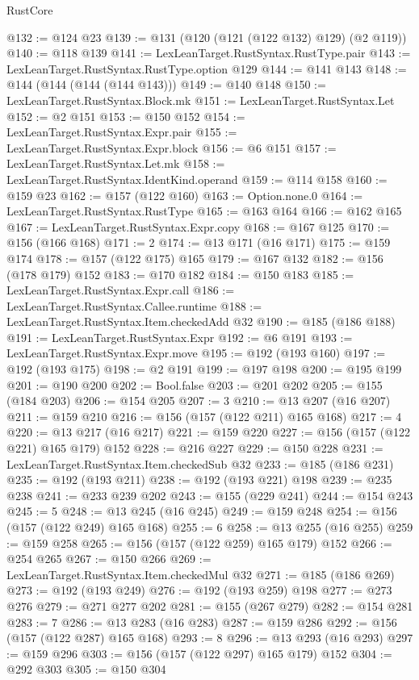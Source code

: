 \begin{lexlean}{RustCore}
\begin{coremodule}
@132 := @124 @23
@139 := @131 (@120 (@121 (@122 @132) @129) (@2 @119))
@140 := @118 @139
@141 := LexLeanTarget.RustSyntax.RustType.pair
@143 := LexLeanTarget.RustSyntax.RustType.option @129
@144 := @141 @143
@148 := @144 (@144 (@144 (@144 @143)))
@149 := @140 @148
@150 := LexLeanTarget.RustSyntax.Block.mk
@151 := LexLeanTarget.RustSyntax.Let
@152 := @2 @151
@153 := @150 @152
@154 := LexLeanTarget.RustSyntax.Expr.pair
@155 := LexLeanTarget.RustSyntax.Expr.block
@156 := @6 @151
@157 := LexLeanTarget.RustSyntax.Let.mk
@158 := LexLeanTarget.RustSyntax.IdentKind.operand
@159 := @114 @158
@160 := @159 @23
@162 := @157 (@122 @160)
@163 := Option.none.{0}
@164 := LexLeanTarget.RustSyntax.RustType
@165 := @163 @164
@166 := @162 @165
@167 := LexLeanTarget.RustSyntax.Expr.copy
@168 := @167 @125
@170 := @156 (@166 @168)
@171 := 2
@174 := @13 @171 (@16 @171)
@175 := @159 @174
@178 := @157 (@122 @175) @165
@179 := @167 @132
@182 := @156 (@178 @179) @152
@183 := @170 @182
@184 := @150 @183
@185 := LexLeanTarget.RustSyntax.Expr.call
@186 := LexLeanTarget.RustSyntax.Callee.runtime
@188 := LexLeanTarget.RustSyntax.Item.checkedAdd @32
@190 := @185 (@186 @188)
@191 := LexLeanTarget.RustSyntax.Expr
@192 := @6 @191
@193 := LexLeanTarget.RustSyntax.Expr.move
@195 := @192 (@193 @160)
@197 := @192 (@193 @175)
@198 := @2 @191
@199 := @197 @198
@200 := @195 @199
@201 := @190 @200
@202 := Bool.false
@203 := @201 @202
@205 := @155 (@184 @203)
@206 := @154 @205
@207 := 3
@210 := @13 @207 (@16 @207)
@211 := @159 @210
@216 := @156 (@157 (@122 @211) @165 @168)
@217 := 4
@220 := @13 @217 (@16 @217)
@221 := @159 @220
@227 := @156 (@157 (@122 @221) @165 @179) @152
@228 := @216 @227
@229 := @150 @228
@231 := LexLeanTarget.RustSyntax.Item.checkedSub @32
@233 := @185 (@186 @231)
@235 := @192 (@193 @211)
@238 := @192 (@193 @221) @198
@239 := @235 @238
@241 := @233 @239 @202
@243 := @155 (@229 @241)
@244 := @154 @243
@245 := 5
@248 := @13 @245 (@16 @245)
@249 := @159 @248
@254 := @156 (@157 (@122 @249) @165 @168)
@255 := 6
@258 := @13 @255 (@16 @255)
@259 := @159 @258
@265 := @156 (@157 (@122 @259) @165 @179) @152
@266 := @254 @265
@267 := @150 @266
@269 := LexLeanTarget.RustSyntax.Item.checkedMul @32
@271 := @185 (@186 @269)
@273 := @192 (@193 @249)
@276 := @192 (@193 @259) @198
@277 := @273 @276
@279 := @271 @277 @202
@281 := @155 (@267 @279)
@282 := @154 @281
@283 := 7
@286 := @13 @283 (@16 @283)
@287 := @159 @286
@292 := @156 (@157 (@122 @287) @165 @168)
@293 := 8
@296 := @13 @293 (@16 @293)
@297 := @159 @296
@303 := @156 (@157 (@122 @297) @165 @179) @152
@304 := @292 @303
@305 := @150 @304

\end{coremodule}
\end{lexlean}
